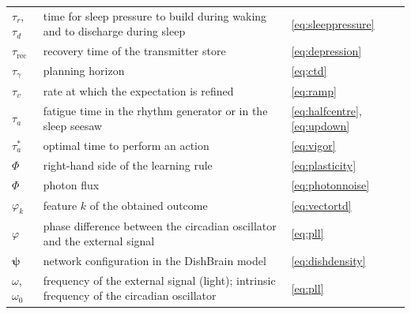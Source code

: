 \begin{center}
\begin{longtable}{>{\raggedright}p{2.0cm}>{\raggedright}p{9.6cm}>{\raggedright\arraybackslash}p{2.4cm}}
$\tau_r$, $\tau_d$ & time for sleep pressure to build during waking and to discharge during sleep & \eqref{eq:sleeppressure} \\
$\tau_{\text{rec}}$ & recovery time of the transmitter store & \eqref{eq:depression} \\
$\tau_\gamma$ & planning horizon & \eqref{eq:ctd} \\
$\tau_v$ & rate at which the expectation is refined & \eqref{eq:ramp} \\
$\tau_a$ & fatigue time in the rhythm generator or in the sleep seesaw & \eqref{eq:halfcentre}, \eqref{eq:updown} \\
$\tau_a^*$ & optimal time to perform an action & \eqref{eq:vigor} \\
$\Phi$ & right-hand side of the learning rule & \eqref{eq:plasticity} \\
$\Phi$ & photon flux & \eqref{eq:photonnoise} \\
$\varphi_k$ & feature $k$ of the obtained outcome & \eqref{eq:vectortd} \\
$\varphi$ & phase difference between the circadian oscillator and the external signal & \eqref{eq:pll} \\
$\boldsymbol\psi$ & network configuration in the DishBrain model & \eqref{eq:dishdensity} \\
$\omega$, $\omega_0$ & frequency of the external signal (light); intrinsic frequency of the circadian oscillator & \eqref{eq:pll} \\
\end{longtable}
\end{center}
